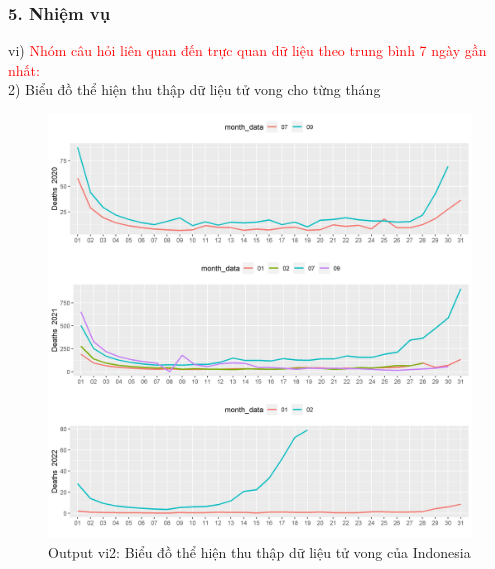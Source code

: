 \documentclass[english,10pt,table]{beamer}
\begin{document}
\begin{frame}[fragile]
\frametitle{5.  Nhiệm vụ}
vi) \textcolor{red}{Nhóm câu hỏi liên quan đến trực quan dữ liệu theo trung bình 7 ngày gần nhất:}\\
    2) Biểu đồ thể hiện thu thập dữ liệu tử vong cho từng tháng
	\begin{figure}[h!]
	\begin{center}
		    \includegraphics[scale = 0.26]{Images/VI/vi2 Indonesia .jpeg}
		     \caption{Output vi2: Biểu đồ thể hiện thu thập dữ liệu tử vong của Indonesia}
		\end{center}
		\end{figure}
\end{frame}
\end{document}
